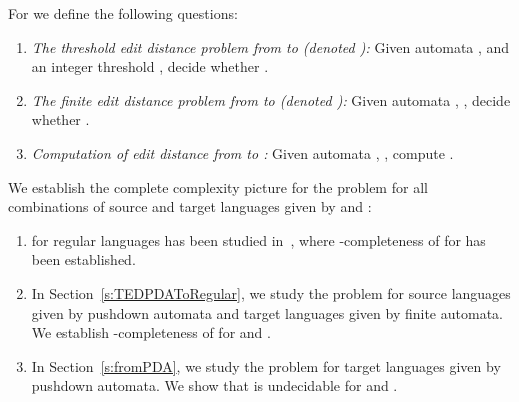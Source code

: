 \documentclass{CSML}
\newcommand{\PSPACE}{\textsf{PSpace}}
\newcommand{\EXPTIME}{\textsf{ExpTime}}
\newcommand{\undecidable}{undecidable}
\begin{document}
\begin{defi}
For   we define the following questions:
\begin{enumerate}
\item \emph{The threshold edit distance problem from  to  (denoted ):} 
Given automata ,  and an integer threshold , 
decide whether .

\item
 \emph{The finite edit distance problem from  to  (denoted ):}
Given automata  , ,
decide whether .


\item \emph{Computation of edit distance from  to :}
Given automata  , ,
compute .
\end{enumerate}
\end{defi}


\noindent We establish the complete complexity picture for the  problem for all combinations of 
source and target languages given by  and :
\begin{enumerate}
\item  for regular languages has been studied in~\cite{riveros}, where 
 -completeness of  for  
has been established.
\item In Section~\ref{s:TEDPDAToRegular}, we study  the  problem 
for source languages given by pushdown automata and target languages given 
by finite automata. 
We establish -completeness of  for
  and .
\item In Section~\ref{s:fromPDA}, we study the  problem for target languages
given by pushdown automata. We show that  is undecidable for 
 and .
\end{enumerate}

\begin{comment}
Table~\ref{tab:complexityOfTED} summarizes the complexity of the  problem.

\begin{table}
\centering
\begin{tabular}{|c|c|c|}
\hline
&   &  \\
\hline
 & \PSPACE-c~\cite{riveros}  &  \multirow{2}{*}{\textbf{\undecidable{} (Prop.~\ref{p:undecidable} and Th.~\ref{th:fromDPDAUndecidable})}}\\
\cline{1-2}
 & \textbf{{\EXPTIME-c (Th.~\ref{th:mainTED})}}  & \\
\hline
\end{tabular}
\caption{Complexity of  with references to the results.}
\label{tab:complexityOfTED}
\end{table}
\end{comment}
\end{document}
